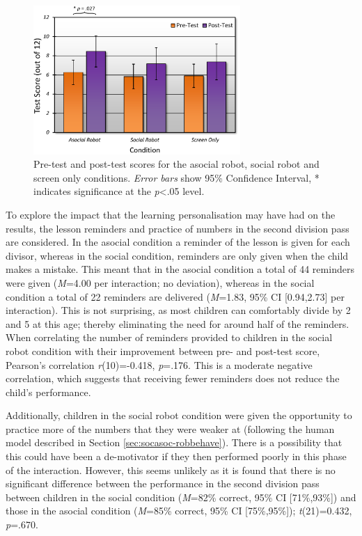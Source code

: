 \begin{figure}[t!]
    \centering
    \includegraphics[width=0.7\textwidth]{images/ch7_pre_post_graph.pdf}
    \caption{Pre-test and post-test scores for the asocial robot, social robot and screen only conditions. \textit{Error bars} show 95\% Confidence Interval, * indicates significance at the \textit{p}\textless .05 level.}
    \label{fig:ch7_prepostgraph}
\end{figure}

To explore the impact that the \gls{learning} personalisation may have had on the results, the lesson reminders and practice of numbers in the second division pass are considered. In the asocial condition a reminder of the lesson is given for each divisor, whereas in the social condition, reminders are only given when the child makes a mistake. This meant that in the asocial condition a total of 44 reminders were given (\textit{M}=4.00 per interaction; no deviation), whereas in the social condition a total of 22 reminders are delivered (\textit{M}=1.83, 95\% CI [0.94,2.73] per interaction). This is not surprising, as most children can comfortably divide by 2 and 5 at this age; thereby eliminating the need for around half of the reminders. When correlating the number of reminders provided to children in the social robot condition with their improvement between pre- and post-test score, Pearson's correlation \textit{r}(10)=-0.418, \textit{p}=.176. This is a moderate negative correlation, which suggests that receiving fewer reminders does not reduce the child's performance.

Additionally, children in the social robot condition were given the opportunity to practice more of the numbers that they were weaker at (following the human model described in Section \ref{sec:socasoc-robbehave}). There is a possibility that this could have been a de-motivator if they then performed poorly in this phase of the interaction. However, this seems unlikely as it is found that there is no significant difference between the performance in the second division pass between children in the social condition (\textit{M}=82\% correct, 95\% CI [71\%,93\%]) and those in the asocial condition (\textit{M}=85\% correct, 95\% CI [75\%,95\%]); \textit{t}(21)=0.432, \textit{p}=.670.

